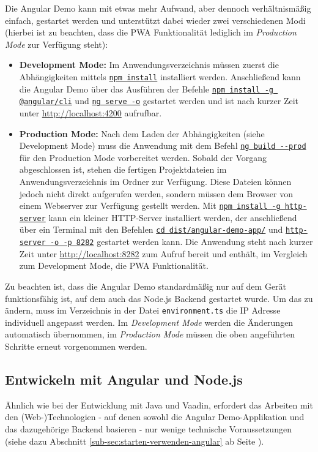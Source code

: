 \documentclass[a4paper,12pt,twoside]{scrreprt}
\begin{document}
Die Angular Demo kann mit etwas mehr Aufwand, aber dennoch verhältnismäßig einfach, gestartet werden und unterstützt dabei wieder zwei verschiedenen Modi (hierbei ist zu beachten, dass die \ac{PWA} Funktionalität lediglich im \textit{Production Mode} zur Verfügung steht):

\begin{itemize}
    \item \textbf{Development Mode:} Im Anwendungsverzeichnis  müssen zuerst die Abhängigkeiten mittels \underline{\texttt{npm install}} installiert werden. Anschließend kann die Angular Demo über das Ausführen der Befehle \underline{\texttt{npm install -g @angular/cli}} und \underline{\texttt{ng serve -o}} gestartet werden und ist nach kurzer Zeit unter \url{http://localhost:4200} aufrufbar.
    \item \textbf{Production Mode:} Nach dem Laden der Abhängigkeiten (siehe Development Mode) muss die Anwendung mit dem Befehl \underline{\texttt{ng build -{}-prod}} für den Production Mode vorbereitet werden. Sobald der Vorgang abgeschlossen ist, stehen die fertigen Projektdateien im Anwendungsverzeichnis im Ordner  zur Verfügung. \newline
    Diese Dateien können jedoch nicht direkt aufgerufen werden, sondern müssen dem Browser von einem Webserver zur Verfügung gestellt werden. Mit \underline{\texttt{npm install -g http-server}} kann ein kleiner HTTP-Server installiert werden, der anschließend über ein Terminal mit den Befehlen \underline{\texttt{cd dist/angular-demo-app/}} und  \underline{\texttt{http-server -o -p 8282}} gestartet werden kann. Die Anwendung steht nach kurzer Zeit unter \url{http://localhost:8282} zum Aufruf bereit und enthält, im Vergleich zum Development Mode, die \ac{PWA} Funktionalität.
\end{itemize}

Zu beachten ist, dass die Angular Demo standardmäßig nur auf dem Gerät funktionsfähig ist, auf dem auch das Node.js Backend gestartet wurde. Um das zu ändern, muss im Verzeichnis  in der Datei \texttt{environment.ts} die IP Adresse individuell angepasst werden. Im \textit{Development Mode} werden die Änderungen automatisch übernommen, im \textit{Production Mode} müssen die oben angeführten Schritte erneut vorgenommen werden.

\subsection{Entwickeln mit Angular und Node.js}
\label{sub-sec:entwickeln-angular}
Ähnlich wie bei der Entwicklung mit Java und Vaadin, erfordert das Arbeiten mit den (Web-)Technologien - auf denen sowohl die Angular Demo-Applikation und das dazugehörige Backend basieren - nur wenige technische Voraussetzungen (siehe dazu Abschnitt \ref{sub-sec:starten-verwenden-angular} ab Seite \pageref{sub-sec:starten-verwenden-angular}).
\end{document}
